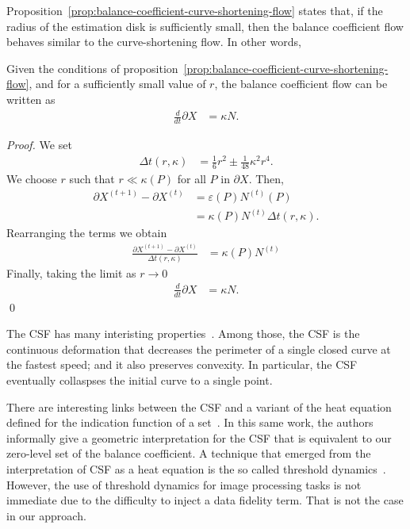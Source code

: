 \documentclass[smallextended]{svjour3}
\begin{document}
%
%
Proposition~\ref{prop:balance-coefficient-curve-shortening-flow} states that, if the radius of the estimation disk is sufficiently small, then the balance coefficient flow behaves similar to the curve-shortening flow. In other words,
%
%
\begin{corollary}
Given the conditions of proposition~\ref{prop:balance-coefficient-curve-shortening-flow}, and for a sufficiently small value of $r$, the balance coefficient flow can be written as
%
%
\begin{align*}
	\frac{ d}{dt} \partial X &= \kappa N.
\end{align*}
%
%
\end{corollary}
%
%
\begin{proof}
We set
\begin{align*}
	\Delta t(r,\kappa) &= \frac{1}{6}r^2 \pm \frac{1}{48}\kappa^2r^4.
\end{align*}
We choose $r$ such that $r \ll \kappa(P)$ for all $P$ in $\partial X$. Then,
%
%
\begin{align*}
	\partial X^{(t+1)} - \partial X^{(t)} &= \varepsilon(P)N^{(t)}(P) \\
	&= \kappa(P)N^{(t)}\Delta t(r,\kappa). 
\end{align*}
%
%
Rearranging the terms we obtain
%
%
\begin{align*}
	\frac{\partial X^{(t+1)} - \partial X^{(t)}}{\Delta t(r,\kappa)} &= \kappa(P)N^{(t)}
\end{align*}
%
%
Finally, taking the limit as $r \rightarrow 0$
%
%
\begin{align*}
	\frac{d}{dt}\partial X &= \kappa N. 
\end{align*}
%
%
\qed
\end{proof}
%
%
The CSF has many interisting properties~\cite{huisken84flow,gage86heat,ecker2008heat}. Among those, the CSF is the continuous deformation that decreases the perimeter of a single closed curve at the fastest speed; and it also preserves convexity. In particular, the CSF eventually collaspses the initial curve to a single point.

There are interesting links between the CSF and a variant of the heat equation defined for the indication function of a set~\cite{merriman1992diffusion}. In this same work, the authors informally give a geometric interpretation for the CSF that is equivalent to our zero-level set of the balance coefficient. A technique that emerged from the interpretation of CSF as a heat equation is the so called threshold dynamics~\cite{esedoglu2005threshold,esedoglu2008threshold}. However, the use of threshold dynamics for image processing tasks is not immediate due to the difficulty to inject a data fidelity term. That is not the case in our approach.
\end{document}
